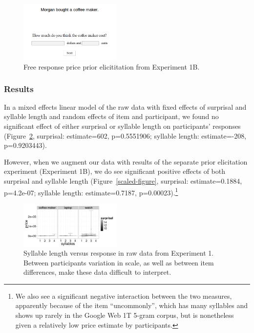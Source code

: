 \documentclass[10pt,letterpaper]{article}
\begin{document}
      \begin{figure}[ht]
      \begin{center}
      \includegraphics[width=0.45\textwidth]{screenshot2.png}
      \end{center}
      \caption{Free response price prior elicititation from Experiment 1B.}
      \label{screenshot2}
      \end{figure}
      
  \subsubsection{Results}
  
  In a mixed effects linear model of the raw data with fixed effects of surprisal and syllable length and random effects of item and participant, we found no significant effect of either surprisal or syllable length on participants' responses (Figure~\ref{raw-figure}, surprisal: estimate=602, p=0.5551906; syllable length: estimate=-208, p=0.9203443).
  
  However, when we augment our data with results of the separate prior elicitation experiment (Experiment 1B), we do see significant positive effects of both surprisal and syllable length (Figure~\ref{scaled-figure}, surprisal: estimate=0.1884, p=4.2e-07; syllable length: estimate=0.7187, p=0.00023).\footnote{We also see a significant negative interaction between the two measures, apparently because of the item ``uncommonly'', which has many syllables and shows up rarely in the Google Web 1T 5-gram corpus, but is nonetheless given a relatively low price estimate by participants.}
  
  \begin{figure}[ht]
  \begin{center}
  \includegraphics[width=0.45\textwidth]{exp1-raw-syllables.png}
  \end{center}
  \caption{Syllable length versus response in raw data from Experiment 1. Between participants variation in scale, as well as between item differences, make these data difficult to interpret.} 
  \label{raw-figure}
  \end{figure}
  
\end{document}
